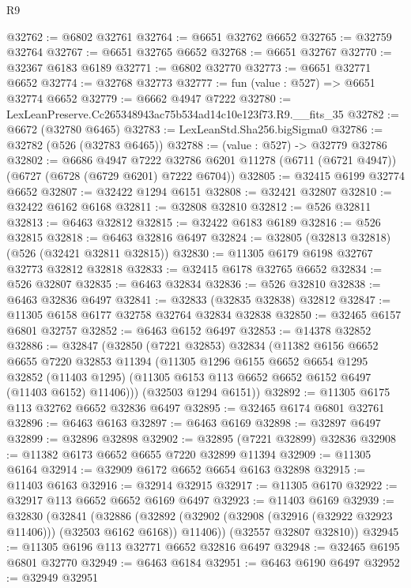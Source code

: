 \begin{lexlean}{R9}
\begin{coremodule}
@32762 := @6802 @32761
@32764 := @6651 @32762 @6652
@32765 := @32759 @32764
@32767 := @6651 @32765 @6652
@32768 := @6651 @32767
@32770 := @32367 @6183 @6189
@32771 := @6802 @32770
@32773 := @6651 @32771 @6652
@32774 := @32768 @32773
@32777 := fun (value : @527) => @6651 @32774 @6652
@32779 := @6662 @4947 @7222
@32780 := LexLeanPreserve.Cc265348943ac75b534ad14c10e123f73.R9.__fits_35
@32782 := @6672 (@32780 @6465)
@32783 := LexLeanStd.Sha256.bigSigma0
@32786 := @32782 (@526 (@32783 @6465))
@32788 := (value : @527) -> @32779 @32786
@32802 := @6686
    @4947
    @7222
    @32786
    @6201
    @11278
    (@6711 (@6721 @4947))
    (@6727 (@6728 (@6729 @6201) @7222 @6704))
@32805 := @32415 @6199 @32774 @6652
@32807 := @32422 @1294 @6151
@32808 := @32421 @32807
@32810 := @32422 @6162 @6168
@32811 := @32808 @32810
@32812 := @526 @32811
@32813 := @6463 @32812
@32815 := @32422 @6183 @6189
@32816 := @526 @32815
@32818 := @6463 @32816 @6497
@32824 := @32805 (@32813 @32818) (@526 (@32421 @32811 @32815))
@32830 := @11305 @6179 @6198 @32767 @32773 @32812 @32818
@32833 := @32415 @6178 @32765 @6652
@32834 := @526 @32807
@32835 := @6463 @32834
@32836 := @526 @32810
@32838 := @6463 @32836 @6497
@32841 := @32833 (@32835 @32838) @32812
@32847 := @11305 @6158 @6177 @32758 @32764 @32834 @32838
@32850 := @32465 @6157 @6801 @32757
@32852 := @6463 @6152 @6497
@32853 := @14378 @32852
@32886 := @32847
    (@32850
      (@7221 @32853)
      @32834
      (@11382
        @6156
        @6652
        @6655
        @7220
        @32853
        @11394
        (@11305
          @1296
          @6155
          @6652
          @6654
          @1295
          @32852
          (@11403 @1295)
          (@11305 @6153 @113 @6652 @6652 @6152 @6497 (@11403 @6152) @11406)))
      (@32503 @1294 @6151))
@32892 := @11305 @6175 @113 @32762 @6652 @32836 @6497
@32895 := @32465 @6174 @6801 @32761
@32896 := @6463 @6163
@32897 := @6463 @6169
@32898 := @32897 @6497
@32899 := @32896 @32898
@32902 := @32895 (@7221 @32899) @32836
@32908 := @11382 @6173 @6652 @6655 @7220 @32899 @11394
@32909 := @11305 @6164
@32914 := @32909 @6172 @6652 @6654 @6163 @32898
@32915 := @11403 @6163
@32916 := @32914 @32915
@32917 := @11305 @6170
@32922 := @32917 @113 @6652 @6652 @6169 @6497
@32923 := @11403 @6169
@32939 := @32830
    (@32841
      (@32886
        (@32892 (@32902 (@32908 (@32916 (@32922 @32923 @11406))) (@32503 @6162 @6168)) @11406))
      (@32557 @32807 @32810))
@32945 := @11305 @6196 @113 @32771 @6652 @32816 @6497
@32948 := @32465 @6195 @6801 @32770
@32949 := @6463 @6184
@32951 := @6463 @6190 @6497
@32952 := @32949 @32951

\end{coremodule}
\end{lexlean}
